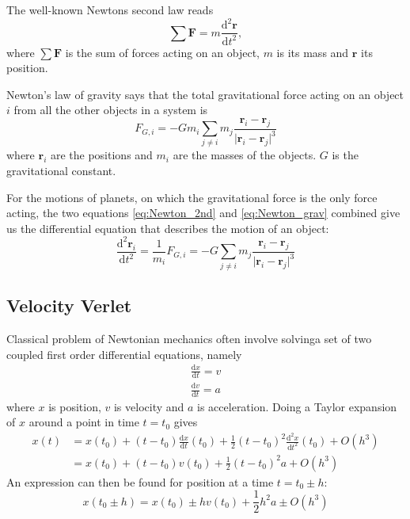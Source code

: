 \documentclass[reprint, english,notitlepage,nofootinbib]{revtex4-1}  %
\newcommand{\vc}[1]{\mathbf{#1}}
\begin{document}
The well-known Newtons second law reads
\begin{equation}
  \label{eq:Newton_2nd}
  \sum \vc F = m \frac{\mathrm d^2 \vc r}{\mathrm d t^2},
\end{equation}
where $\sum \vc F$ is the sum of forces acting on an object, $m$ is its mass and $\vc r$ its position.

Newton's law of gravity says that the total gravitational force acting on an object $i$ from all the other objects in a system is
\begin{equation}
  \label{eq:Newton_grav}
  F_{G, i} = - G m_i \sum_{j \neq i} m_j \frac{\vc r_i - \vc r_j}{ \lvert \vc r_i - \vc r_j \rvert ^3}
\end{equation}
where $\vc r_i$ are the positions and $m_i$ are the masses of the objects. $G$ is the gravitational constant.

For the motions of planets, on which the gravitational force is the only force acting, the two equations \ref{eq:Newton_2nd} and \ref{eq:Newton_grav} combined give us the differential equation that describes the motion of an object:
\begin{equation}
  \label{eq:DE}
  \frac{\mathrm d^2 \vc r_i}{\mathrm d t^2} = \frac{1}{m_i} F_{G, i} = - G \sum_{j \neq i} m_j \frac{\vc r_i - \vc r_j}{ \lvert \vc r_i - \vc r_j \rvert ^3}
\end{equation}


\subsection{Velocity Verlet}

Classical problem of Newtonian mechanics often involve solvinga set of two coupled first order differential equations, namely
\begin{align*}
  \frac{\mathrm d x}{\mathrm dt} = v \\
  \frac{\mathrm d v}{\mathrm dt} = a
\end{align*}
where $x$ is position, $v$ is velocity and $a$ is acceleration. Doing a Taylor expansion of $x$ around a point in time $t = t_0$ gives
\begin{align*}
  x(t) &= x(t_0) + (t - t_0) \frac{\mathrm d x}{\mathrm dt}(t_0) + \frac{1}{2} (t - t_0)^2 \frac{\mathrm d^2 x}{\mathrm dt^2}(t_0) + O(h^3) \\
  &= x(t_0) + (t - t_0) v(t_0) + \frac{1}{2} (t - t_0)^2 a + O(h^3)
\end{align*}
An expression can then be found for position at a time $t = t_0 \pm h$:
\begin{equation}
  \label{eq:Taylor_exp_x}
  x(t_0 \pm h) = x(t_0) \pm h v(t_0) + \frac{1}{2} h^2 a \pm O(h^3)
\end{equation}
\end{document}
